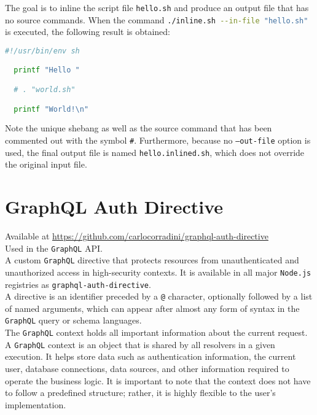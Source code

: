 The goal is to inline the script file \texttt{hello.sh} and produce an output
file that has no source commands. When the command %
\lstinline[language=sh, basicstyle=\ttfamily, deletekeywords={in}, alsoletter={.},
morekeywords={inline.sh}]{./inline.sh --in-file "hello.sh"} %
is executed, the following result is obtained:

\begin{lstlisting}[language=sh, morekeywords={., printf}, xleftmargin=\parindent, caption=Inlined script \texttt{hello.inlined.sh}]
  #!/usr/bin/env sh

  printf "Hello "

  # . "world.sh"

  printf "World!\n"
\end{lstlisting}

Note the unique shebang as well as the source command that has been commented out
with the symbol \texttt{\#}. Furthermore, because no \texttt{--out-file} option is
used, the final output file is named \texttt{hello.inlined.sh}, which does not
override the original input file.

\section{GraphQL Auth Directive}
\label{sec:corollary_projects_graphql_auth_diretive}

Available at \url{https://github.com/carlocorradini/graphql-auth-directive} \\ %
Used in the \texttt{GraphQL} API. \\ %
A custom \texttt{GraphQL} directive that protects resources from unauthenticated
and unauthorized access in high-security contexts. It is available in all major \texttt{Node.js}
registries as \texttt{graphql-auth-directive}. \\ %
A directive is an identifier preceded by a \texttt{@} character, optionally followed
by a list of named arguments, which can appear after almost any form of syntax
in the \texttt{GraphQL} query or schema languages\cite{graphql_directive}. \\ %
The \texttt{GraphQL} context holds all important information about the current request.
A \texttt{GraphQL} context is an object that is shared by all resolvers in a given
execution. It helps store data such as authentication information, the current user,
database connections, data sources, and other information required to operate
the business logic\cite{graphql_context}. It is important to note that the
context does not have to follow a predefined structure; rather, it is highly
flexible to the user's implementation.


